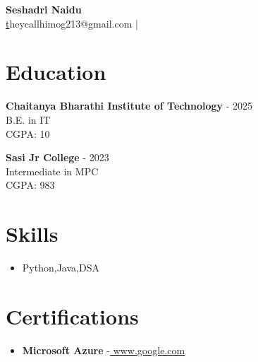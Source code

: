 \documentclass[a4paper,10pt]{article}
\begin{document}
\pagestyle{empty}

\begin{center}
    {\LARGE \textbf{ Seshadri Naidu }}\\
    \href{mailto: theycallhimog213@gmail.com }theycallhimog213@gmail.com \quad |  \\
\end{center}

\section*{Education}

    \textbf{ Chaitanya Bharathi Institute of Technology }  - 2025 \\
    {  } B.E. in IT \\
    {  }  CGPA: 10

    \textbf{ Sasi Jr College }  - 2023 \\
    {  } Intermediate in MPC \\
    {  }  CGPA: 983



\section*{Skills}
\begin{itemize}[leftmargin=*]
  
    \item Python,Java,DSA
  
\end{itemize}



\section*{Certifications}
\begin{itemize}[leftmargin=*]
  
    \item \textbf{ Microsoft Azure } {-}\href{ www.google.com }{ www.google.com } \hfill{  }
  
\end{itemize}


\end{document}
